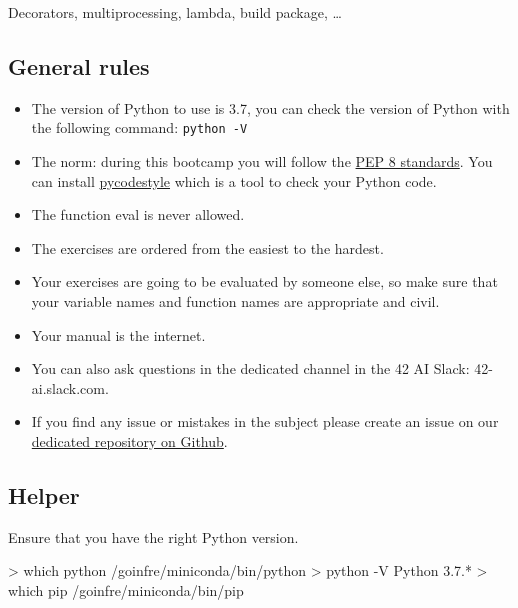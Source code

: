 \documentclass[]{article}
\newenvironment{Shaded}{\begin{snugshade}}{\end{snugshade}}
\newcommand{\NormalTok}[1]{\textcolor[rgb]{0.81,0.81,0.76}{#1}}
\begin{document}
Decorators, multiprocessing, lambda, build package, \ldots{}

\hypertarget{general-rules}{%
\subsection{General rules}\label{general-rules}}

\begin{itemize}
\item
  The version of Python to use is 3.7, you can check the version of
  Python with the following command: \texttt{python\ -V}
\item
  The norm: during this bootcamp you will follow the
  \href{https://www.python.org/dev/peps/pep-0008/}{PEP 8 standards}. You
  can install \href{https://pypi.org/project/pycodestyle}{pycodestyle}
  which is a tool to check your Python code.
\item
  The function eval is never allowed.
\item
  The exercises are ordered from the easiest to the hardest.
\item
  Your exercises are going to be evaluated by someone else, so make sure
  that your variable names and function names are appropriate and civil.
\item
  Your manual is the internet.
\item
  You can also ask questions in the dedicated channel in the 42 AI
  Slack: 42-ai.slack.com.
\item
  If you find any issue or mistakes in the subject please create an
  issue on our
  \href{https://github.com/42-AI/bootcamp_python/issues}{dedicated
  repository on Github}.
\end{itemize}

\hypertarget{helper}{%
\subsection{Helper}\label{helper}}

Ensure that you have the right Python version.

\begin{Shaded}
\begin{Highlighting}[]
\NormalTok{> which python}
\NormalTok{/goinfre/miniconda/bin/python}
\NormalTok{> python -V}
\NormalTok{Python 3.7.*}
\NormalTok{> which pip}
\NormalTok{/goinfre/miniconda/bin/pip}
\end{Highlighting}
\end{Shaded}
\end{document}
